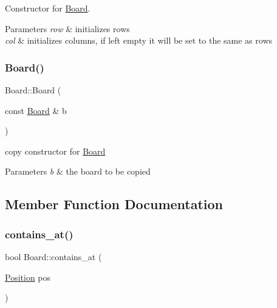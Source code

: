 Constructor for \hyperlink{class_board}{Board}. 


\begin{DoxyParams}{Parameters}
{\em row} & initializes rows \\
\hline
{\em col} & initializes columns, if left empty it will be set to the same as rows \\
\hline
\end{DoxyParams}
\mbox{\label{class_board_ac77f209904bb37545295c17649a9dc17}} 
\subsubsection{\texorpdfstring{Board()}{Board()}\hspace{0.1cm}{\footnotesize\ttfamily [2/2]}}
{\footnotesize\ttfamily Board\+::\+Board (\begin{DoxyParamCaption}\item[{const \hyperlink{class_board}{Board} \&}]{b }\end{DoxyParamCaption})}



copy constructor for \hyperlink{class_board}{Board} 


\begin{DoxyParams}{Parameters}
{\em b} & the board to be copied \\
\hline
\end{DoxyParams}


\subsection{Member Function Documentation}
\mbox{\label{class_board_a727409cb7ffce590a8d0bf2fc2524285}} 
\subsubsection{\texorpdfstring{contains\+\_\+at()}{contains\_at()}}
{\footnotesize\ttfamily bool Board\+::contains\+\_\+at (\begin{DoxyParamCaption}\item[{\hyperlink{struct_position}{Position}}]{pos }\end{DoxyParamCaption})}



